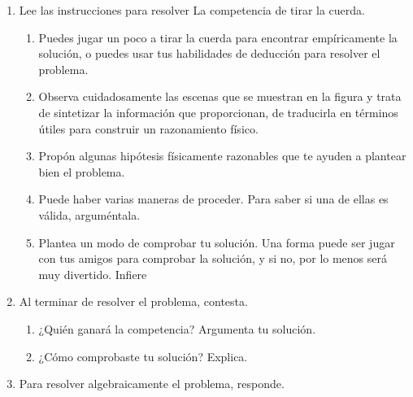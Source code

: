 \documentclass[11pt]{book}
\begin{document}
\begin{boxK}
\begin{enumerate}
  \end{enumerate}

\end{boxK}

\newpage

\begin{boxK}
  \begin{enumerate}\addtocounter{enumi}{2}
    \item Lee las instrucciones para resolver La competencia de tirar la cuerda.
          \begin{enumerate}
            \item Puedes jugar un poco a tirar la cuerda para encontrar empíricamente la
                  solución, o puedes usar tus habilidades de deducción para resolver el
                  problema.
            \item Observa cuidadosamente las escenas que se muestran en la figura y trata
                  de sintetizar la información que proporcionan, de traducirla en términos
                  útiles para construir un razonamiento físico.
            \item Propón algunas hipótesis físicamente razonables que te ayuden a plantear
                  bien el problema.
            \item Puede haber varias maneras de proceder. Para saber si una de ellas es
                  válida, arguméntala.
            \item Plantea un modo de comprobar tu solución. Una forma puede ser jugar
                  con tus amigos para comprobar la solución, y si no, por lo menos será muy
                  divertido.
                  Infiere
          \end{enumerate}

    \item Al terminar de resolver el problema, contesta.
          \begin{enumerate}
            \item ¿Quién ganará la competencia? Argumenta tu solución.
            \item ¿Cómo comprobaste tu solución? Explica.
          \end{enumerate}

    \item Para resolver algebraicamente el problema, responde.


\end{enumerate}
\end{boxK}
\end{document}
